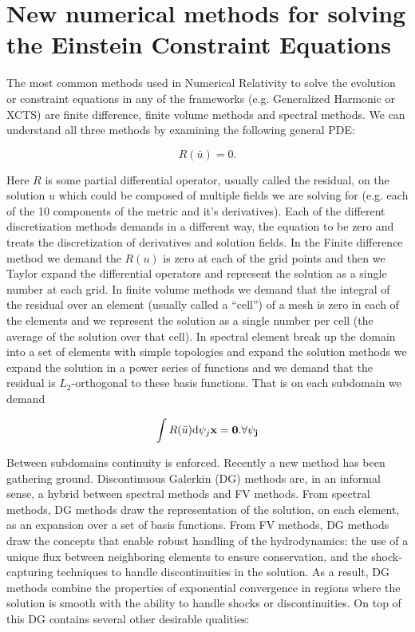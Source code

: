 \section{New numerical methods for solving the Einstein Constraint Equations}

The most common methods used in Numerical Relativity to solve the evolution or constraint equations in any of the frameworks (e.g. Generalized Harmonic or XCTS) are  finite difference, finite volume methods and spectral methods. We can understand all
three methods by examining the following general PDE:

\begin{equation}
 R(\bar u) = 0.
\end{equation}

Here $R$ is some partial differential operator, usually called the residual, on the solution $u$ which could be composed of multiple fields we are solving for (e.g. each of the 10 components of the metric and it's derivatives). Each of the different discretization methods demands in a different way, the equation to be zero and treats the discretization of derivatives and solution fields. In the Finite difference method we demand the $R(u)$ is zero at each of the grid points and then we Taylor expand the differential operators and represent the solution as a single number at each grid. In finite volume methods we demand that the integral of the residual over an element (usually called a ``cell'') of a mesh is zero in each of the elements and we represent the solution as a single number per cell (the average of the solution over that cell). In spectral element break up the domain into a set of elements with simple topologies and expand the solution methods we expand the solution in a power series of functions and we demand that the residual is $L_2$-orthogonal to these basis functions. That is on each subdomain we demand

\begin{equation}
 \int R(\bar u) \mathrm{d} \psi_j \bf{x} = 0. \forall \psi_j
\end{equation}

Between subdomains continuity is enforced. Recently a new method has been gathering ground. Discontinuous Galerkin (DG) methods are, in an informal sense, a hybrid between spectral methods and FV methods. From spectral methods, DG methods draw the representation of the solution, on each element, as an expansion over a set of basis functions. From FV methods, DG methods draw the concepts that enable robust handling of the hydrodynamics: the use of a unique flux between neighboring elements to ensure conservation, and the shock-capturing
techniques to handle discontinuities in the solution. As a result, DG methods combine the properties of exponential convergence in regions where
the solution is smooth with the ability to handle shocks or discontinuities. On top of this DG contains several other desirable qualities:

